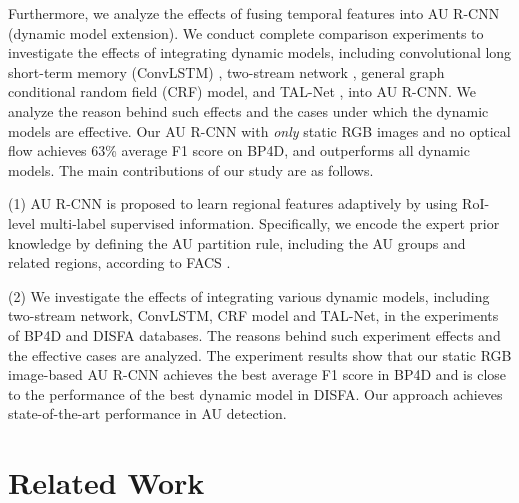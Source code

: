 \documentclass[5p,twocolumn]{elsarticle}
\begin{document}
Furthermore, we analyze the effects of fusing temporal features into AU R-CNN (dynamic model extension). We conduct complete comparison experiments to investigate the effects of integrating dynamic models, including convolutional long short-term memory (ConvLSTM) \cite{xingjian2015convolutional}, two-stream network \cite{feichtenhofer2016convolutional}, general graph conditional random field (CRF) model, and TAL-Net \cite{chao2018rethinking}, into AU R-CNN. We analyze the reason behind such effects and the cases under which the dynamic models are effective. Our AU R-CNN with \textit{only} static RGB images and no optical flow achieves 63\% average F1 score on BP4D, and outperforms all dynamic models.
The main contributions of our study are as follows.
  
  (1) AU R-CNN is proposed to learn regional features adaptively by using RoI-level multi-label supervised information. Specifically, we encode the expert prior knowledge by defining the AU partition rule, including the AU groups and related regions, according to FACS \cite{ekman1977facial}.
  
  (2) We investigate the effects of integrating various dynamic models, including two-stream network, ConvLSTM, CRF model and TAL-Net, in the experiments of BP4D \cite{zhang2014bp4d} and DISFA \cite{mavadati2013disfa} databases. The reasons behind such experiment effects and the effective cases are analyzed. The experiment results show that our static RGB image-based AU R-CNN achieves the best average F1 score in BP4D and is close to the performance of the best dynamic model in DISFA. Our approach achieves state-of-the-art performance in AU detection.


\section{Related Work}
\end{document}

